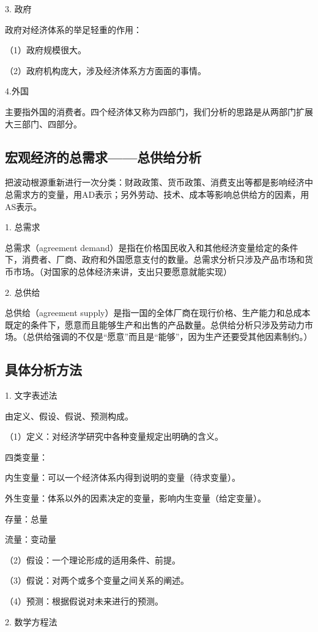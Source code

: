 \documentclass{article}
\begin{document}
3. 政府

政府对经济体系的举足轻重的作用：

（1）政府规模很大。

（2）政府机构庞大，涉及经济体系方方面面的事情。

4.外国

主要指外国的消费者。四个经济体又称为四部门，我们分析的思路是从两部门扩展大三部门、四部分。

\subsection{宏观经济的总需求——总供给分析}
把波动根源重新进行一次分类：财政政策、货币政策、消费支出等都是影响经济中总需求方的变量，用AD表示；另外劳动、技术、成本等影响总供给方的因素，用AS表示。

1. 总需求

总需求（agreement demand）是指在价格国民收入和其他经济变量给定的条件下，消费者、厂商、政府和外国愿意支付的数量。总需求分析只涉及产品市场和货币市场。（对国家的总体经济来讲，支出只要愿意就能实现）

2. 总供给

总供给（agreement supply）是指一国的全体厂商在现行价格、生产能力和总成本既定的条件下，愿意而且能够生产和出售的产品数量。总供给分析只涉及劳动力市场。（总供给强调的不仅是“愿意”而且是“能够”，因为生产还要受其他因素制约。）

\subsection{具体分析方法}
1. 文字表述法

由定义、假设、假说、预测构成。

（1）定义：对经济学研究中各种变量规定出明确的含义。

四类变量：

内生变量：可以一个经济体系内得到说明的变量（待求变量）。

外生变量：体系以外的因素决定的变量，影响内生变量（给定变量）。

存量：总量

流量：变动量

（2）假设：一个理论形成的适用条件、前提。

（3）假说：对两个或多个变量之间关系的阐述。

（4）预测：根据假说对未来进行的预测。

\hspace*{\fill}

2. 数学方程法
\end{document}
